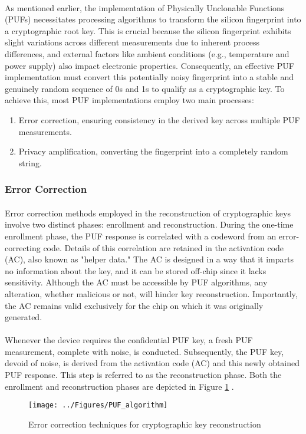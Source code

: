 \paragraph*{}
As mentioned earlier, the implementation of Physically Unclonable Functions (PUFs) necessitates processing algorithms to transform the silicon fingerprint into a cryptographic root key. This is crucial because the silicon fingerprint exhibits slight variations across different measurements due to inherent process differences, and external factors like ambient conditions (e.g., temperature and power supply) also impact electronic properties. Consequently, an effective PUF implementation must convert this potentially noisy fingerprint into a stable and genuinely random sequence of 0s and 1s to qualify as a cryptographic key. To achieve this, most PUF implementations employ two main processes:
\begin{enumerate}
	\item Error correction, ensuring consistency in the derived key across multiple PUF measurements.
	\item Privacy amplification, converting the fingerprint into a completely random string.
\end{enumerate}
\subsubsection{Error Correction}
\paragraph*{}
Error correction methods employed in the reconstruction of cryptographic keys involve two distinct phases: enrollment and reconstruction. During the one-time enrollment phase, the PUF response is correlated with a codeword from an error-correcting code. Details of this correlation are retained in the activation code (AC), also known as "helper data." The AC is designed in a way that it imparts no information about the key, and it can be stored off-chip since it lacks sensitivity. Although the AC must be accessible by PUF algorithms, any alteration, whether malicious or not, will hinder key reconstruction. Importantly, the AC remains valid exclusively for the chip on which it was originally generated.
\paragraph*{}
Whenever the device requires the confidential PUF key, a fresh PUF measurement, complete with noise, is conducted. Subsequently, the PUF key, devoid of noise, is derived from the activation code (AC) and this newly obtained PUF response. This step is referred to as the reconstruction phase. Both the enrollment and reconstruction phases are depicted in Figure \ref{fig:pufalgorithm} .
\begin{figure}[h]
	\centering
	\texttt{[image: ../Figures/PUF\_algorithm]}
	\caption{Error correction techniques for cryptographic key reconstruction}
	\label{fig:pufalgorithm}
\end{figure}
